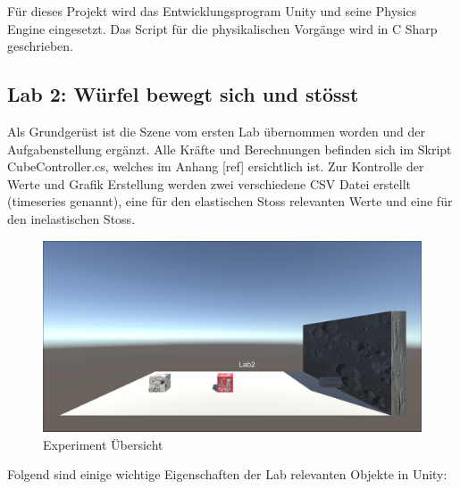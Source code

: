 \documentclass[../main.tex]{subfiles}
\begin{document}
Für dieses Projekt wird das Entwicklungsprogram Unity und seine Physics Engine eingesetzt. Das Script für die physikalischen Vorgänge wird in C Sharp geschrieben.

\subsection{Lab 2: Würfel bewegt sich und stösst}
Als Grundgerüst ist die Szene vom ersten Lab übernommen worden und der Aufgabenstellung ergänzt. Alle Kräfte und Berechnungen befinden sich im Skript CubeController.cs, welches im Anhang [ref] ersichtlich ist. Zur Kontrolle der Werte und Grafik Erstellung werden zwei verschiedene CSV Datei erstellt (timeseries genannt), eine für den elastischen Stoss relevanten Werte und eine für den inelastischen Stoss.

    \begin{figure}[H]
        \begin{center}
        \centerline{\includegraphics[width=155mm]{./images/2Lab_ExperimentOverview}}
            \caption{Experiment Übersicht}
            \label{fig:2Lab_ExperimentOverview}
        \end{center}
    \end{figure}

Folgend sind einige wichtige Eigenschaften der Lab relevanten Objekte in Unity:
\end{document}
